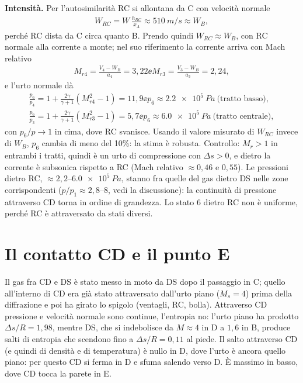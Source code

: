 \textbf{Intensità.} Per l'autosimilarità RC si allontana da C con velocità normale
\begin{gather*}
  W_{RC}=W\,\frac{h_{RC}}{x_A}\approx\SI{510}{m/s}\approx W_B ,
\end{gather*}
perché RC dista da C circa quanto B. Prendo quindi $W_{RC}\approx W_B$, con RC normale alla corrente a monte; nel suo
riferimento la corrente arriva con Mach relativo
\begin{gather*}
  M_{r4}=\frac{V_4-W_B}{a_4}=3{,}22 \ee M_{r3}=\frac{V_3-W_B}{a_3}=2{,}24 ,
\end{gather*}
e l'urto normale dà
\begin{gather*}
  \frac{p_6}{p_4}=1+\frac{2\gamma}{\gamma+1}(M_{r4}^2-1)=11{,}9 \ee p_6\approx\SI{2.2e5}{Pa}\ \text{(tratto basso)},\\
  \frac{p_6}{p_3}=1+\frac{2\gamma}{\gamma+1}(M_{r3}^2-1)=5{,}7 \ee p_6\approx\SI{6.0e5}{Pa}\ \text{(tratto centrale)},
\end{gather*}
con $p_6/p\to1$ in cima, dove RC svanisce. Usando il valore misurato di $W_{RC}$ invece di $W_B$, $p_6$ cambia di meno
del 10\%: la stima è robusta. Controllo: $M_r>1$ in entrambi i tratti, quindi è un urto di compressione con
$\Delta s>0$, e dietro la corrente è subsonica rispetto a RC (Mach relativo $\approx0{,}46$ e $0{,}55$). Le pressioni
dietro RC, $\approx2{,}2$--$\SI{6.0e5}{Pa}$, stanno fra quelle del gas dietro DS nelle zone corrispondenti
($p/p_1\approx2{,}8$--$8$, vedi la discussione): la continuità di pressione attraverso CD torna in ordine di grandezza.
Lo stato 6 dietro RC non è uniforme, perché RC è attraversato da stati diversi.

\section*{Il contatto CD e il punto E}
Il gas fra CD e DS è stato messo in moto da DS dopo il passaggio in C; quello all'interno di CD era già stato
attraversato dall'urto piano ($M_s=4$) prima della diffrazione e poi ha girato lo spigolo (ventagli, RC, bolla).
Attraverso CD pressione e velocità normale sono continue, l'entropia no: l'urto piano ha prodotto $\Delta s/R=1{,}98$,
mentre DS, che si indebolisce da $M\approx4$ in D a $1{,}6$ in B, produce salti di entropia che scendono fino a
$\Delta s/R=0{,}11$ al piede. Il salto attraverso CD (e quindi di densità e di temperatura) è nullo in D, dove l'urto
è ancora quello piano: per questo CD si ferma in D e sfuma salendo verso D. È massimo in basso, dove CD tocca la parete
in E.

